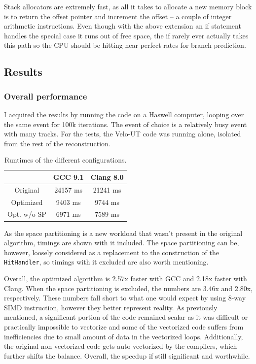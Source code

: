 \documentclass[12pt]{article}
\newcommand{\code}[1]{\texttt{#1}}
\begin{document}
Stack allocators are extremely fast, as all it takes to allocate a new memory block is to return the offset pointer and increment the offset -- a couple of integer arithmetic instructions. Even though with the above extension an if statement handles the special case it runs out of free space, the if rarely ever actually takes this path so the CPU should be hitting near perfect rates for branch prediction.


\subsection{Results}

\subsubsection{Overall performance}

I acquired the results by running the code on a Haswell computer, looping over the same event for 100k iterations. The event of choice is a relatively busy event with many tracks. For the tests, the Velo-UT code was running alone, isolated from the rest of the reconstruction.

\begin{table}[H]
	\centering
	\begin{tabular}{c | c | c}
		& GCC 9.1 & Clang 8.0 \\
		\hline
		Original & 24157 ms & 21241 ms \\
		\hline
		Optimized & 9403 ms & 9744 ms \\
		\hline
		Opt. w/o SP & 6971 ms & 7589 ms
	\end{tabular}
	\caption{Runtimes of the different configurations.}
	\label{tbl_runtimes_local}
\end{table}
	
As the space partitioning is a new workload that wasn't present in the original algorithm, timings are shown with it included. The space partitioning can be, however, loosely considered as a replacement to the construction of the \code{HitHandler}, so timings with it excluded are also worth mentioning.

Overall, the optimized algorithm is 2.57x faster with GCC and 2.18x faster with Clang. When the space partitioning is excluded, the numbers are 3.46x and 2.80x, respectively. These numbers fall short to what one would expect by using 8-way SIMD instruction, however they better represent reality. As previously mentioned, a significant portion of the code remained scalar as it was difficult or practically impossible to vectorize and some of the vectorized code suffers from inefficiencies due to small amount of data in the vectorized loops. Additionally, the original non-vectorized code gets auto-vectorized by the compilers, which further shifts the balance. Overall, the speedup if still significant and worthwhile.
\end{document}
